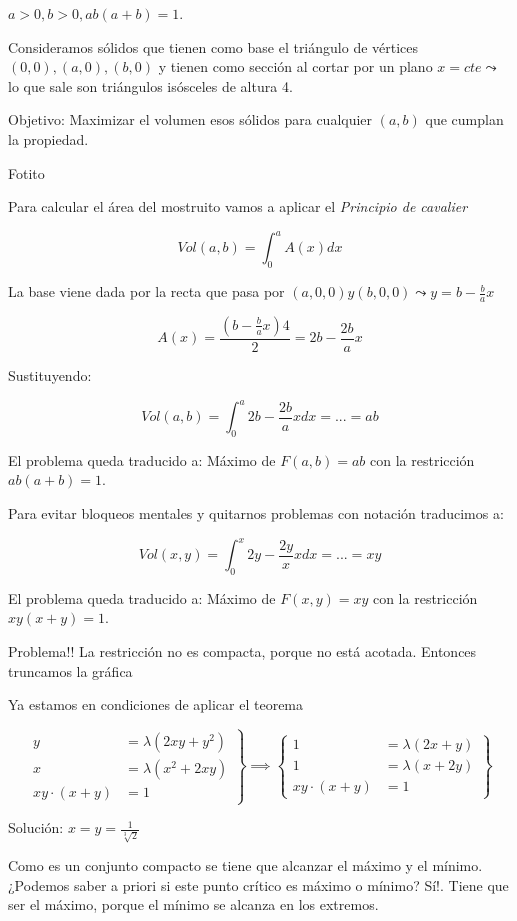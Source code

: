 \begin{problem}[?]

$a>0,b>0, ab(a+b) = 1$.

Consideramos sólidos que tienen como base el triángulo de vértices $(0,0),(a,0),(b,0)$ y tienen como sección al cortar por un plano $x=cte \leadsto$ lo que sale son triángulos isósceles de altura 4.

Objetivo: Maximizar el volumen esos sólidos para cualquier $(a,b)$ que cumplan la propiedad.
\solution

Fotito


Para calcular el área del mostruito vamos a aplicar el \textit{Principio de cavalier} %

\[Vol(a,b) = \int_0^a A(x)dx\]

La base viene dada por la recta que pasa por $(a,0,0) y (b,0,0) \leadsto y=b-\frac{b}{a}x$

\[A(x) = \displaystyle \frac{\left(b-\frac{b}{a}x\right)4}{2} = 2b - \frac{2b}{a}x\]

Sustituyendo:


\[Vol(a,b) = \int_0^a 2b-\frac{2b}{a}xdx = ... = ab\]

El problema queda traducido a: Máximo de $F(a,b) = ab$ con la restricción $ab(a+b)=1$.

Para evitar bloqueos mentales y quitarnos problemas con notación traducimos a:

\[Vol(x,y) = \int_0^x 2y-\frac{2y}{x}xdx = ... = xy\]

El problema queda traducido a: Máximo de $F(x,y) = xy$ con la restricción $xy(x+y)=1$.

Problema!! La restricción no es compacta, porque no está acotada. Entonces truncamos la gráfica

Ya estamos en condiciones de aplicar el teorema

\[\left.\begin{array}{cc} y&= \lambda (2xy + y^2)\\
x&= \lambda(x^2+2xy)\\
xy\cdot(x+y) &= 1\end{array}\right\}\implies
\left\{
\begin{array}{cc}
1&= \lambda(2x+y)\\
1&= \lambda(x+2y)\\
xy\cdot(x+y) &= 1
\end{array}\right\} 
\]

Solución: $x=y = \frac{1}{\sqrt[3]{2}}$

Como es un conjunto compacto se tiene que alcanzar el máximo y el mínimo. ¿Podemos saber a priori si este punto crítico es máximo o mínimo? Sí!. Tiene que ser el máximo, porque el mínimo se alcanza en los extremos.

\end{problem}
